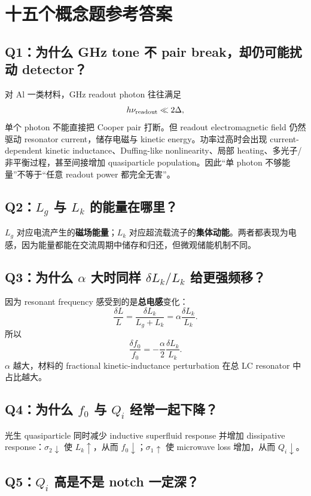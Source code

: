 \documentclass[11pt,a4paper,openany]{ctexrep}
\begin{document}
\section{十五个概念题参考答案}

\subsection*{Q1：为什么 GHz tone 不 pair break，却仍可能扰动 detector？}

对 Al 一类材料，GHz readout photon 往往满足
\[
h\nu_{\rm readout}\ll2\Delta,
\]
单个 photon 不能直接把 Cooper pair 打断。但 readout electromagnetic field 仍然驱动 resonator current，储存电磁与 kinetic energy。功率过高时会出现 current-dependent kinetic inductance、Duffing-like nonlinearity、局部 heating、多光子/非平衡过程，甚至间接增加 quasiparticle population。因此“单 photon 不够能量”不等于“任意 readout power 都完全无害”。

\subsection*{Q2：$L_g$ 与 $L_k$ 的能量在哪里？}

$L_g$ 对应电流产生的\textbf{磁场能量}；$L_k$ 对应超流载流子的\textbf{集体动能}。两者都表现为电感，因为能量都能在交流周期中储存和归还，但微观储能机制不同。

\subsection*{Q3：为什么 $\alpha$ 大时同样 $\delta L_k/L_k$ 给更强频移？}

因为 resonant frequency 感受到的是\textbf{总电感}变化：
\[
\frac{\delta L}{L}
=\frac{\delta L_k}{L_g+L_k}
=\alpha\frac{\delta L_k}{L_k}.
\]
所以
\[
\frac{\delta f_0}{f_0}
=-\frac{\alpha}{2}\frac{\delta L_k}{L_k}.
\]
$\alpha$ 越大，材料的 fractional kinetic-inductance perturbation 在总 LC resonator 中占比越大。

\subsection*{Q4：为什么 $f_0$ 与 $Q_i$ 经常一起下降？}

光生 quasiparticle 同时减少 inductive superfluid response 并增加 dissipative response：$\sigma_2\downarrow$ 使 $L_k\uparrow$，从而 $f_0\downarrow$；$\sigma_1\uparrow$ 使 microwave loss 增加，从而 $Q_i\downarrow$。

\subsection*{Q5：$Q_i$ 高是不是 notch 一定深？}
\end{document}
